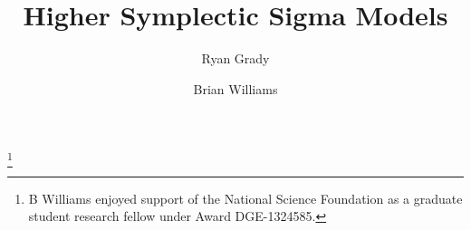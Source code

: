 \documentclass{amsart}
\begin{document}
\title{Higher Symplectic Sigma Models}




\author{Ryan Grady}
\address{Montana State University\\Bozeman 59717\\USA}

\author{Brian Williams}
\address{Northwestern University\\ Evanston 60208\\USA}
\thanks{B Williams enjoyed support of the
National Science Foundation as a graduate student research fellow under Award DGE-1324585.}


\date{}


\maketitle

\tableofcontents

%











\end{document}
